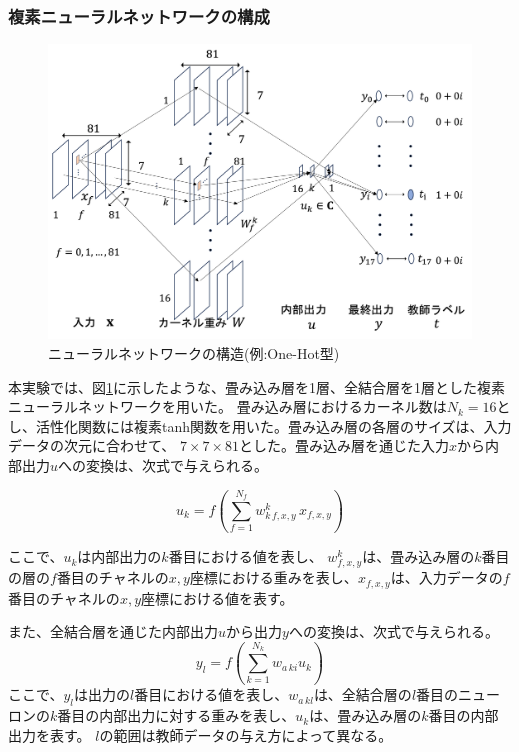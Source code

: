 \documentclass[11pt,a4paper,uplatex]{ujarticle}
\begin{document}
  \subsubsection{複素ニューラルネットワークの構成}
  \begin{figure}[hbtp]
    \centering
    \includegraphics[keepaspectratio, width=130mm]{Images/network.png}
    \caption{ニューラルネットワークの構造(例:One-Hot型)}
    \label{fig:neuralnet}
  \end{figure}
  本実験では、図\ref{fig:neuralnet}に示したような、畳み込み層を1層、全結合層を1層とした複素ニューラルネットワークを用いた。
  畳み込み層におけるカーネル数は$N_k = 16$とし、活性化関数には複素tanh関数を用いた。畳み込み層の各層のサイズは、入力データの次元に合わせて、
  $7\times7\times81$とした。畳み込み層を通じた入力$x$から内部出力$u$への変換は、次式で与えられる。

  \begin{equation}
    u_k = f\left(\sum_{f=1}^{N_f} w_{k\,f,x,y}^k\, x_{f,x,y}\right)
  \end{equation}

  ここで、$u_k$は内部出力の$k$番目における値を表し、
  $w_{f,x,y}^k$は、畳み込み層の$k$番目の層の$f$番目のチャネルの$x,y$座標における重みを表し、$x_{f,x,y}$は、入力データの$f$番目のチャネルの$x,y$座標における値を表す。

  また、全結合層を通じた内部出力$u$から出力$y$への変換は、次式で与えられる。
  \begin{equation}
    y_l = f\left(\sum_{k=1}^{N_k} w_{a\,ki} u_k\right)
  \end{equation}
  ここで、$y_l$は出力の$l$番目における値を表し、$w_{a\,kl}$は、全結合層の$l$番目のニューロンの$k$番目の内部出力に対する重みを表し、$u_k$は、畳み込み層の$k$番目の内部出力を表す。
  $l$の範囲は教師データの与え方によって異なる。
\end{document}

